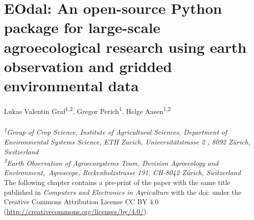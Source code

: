 \chapter{EOdal: An open-source Python package for large-scale agroecological research using earth observation and gridded environmental data}
\label{chap:eodal}
\graphicspath{{./02-EOdal/img}}

Lukas Valentin Graf\textsuperscript{1,2}, Gregor Perich\textsuperscript{1}, Helge Aasen\textsuperscript{1,2}
\\
\normalsize
\vspace{2pt}
\\
\textit{\textsuperscript{1}Group of Crop Science, Institute of Agricultural Sciences, Department of Environmental Systems Science, ETH Zurich, Universitätstrasse 2 , 8092 Zürich, Switzerland
\\
\textsuperscript{2}Earth Observation of Agroecosystems Team, Devision Agroecology and Environment,\ Agroscope, Reckenholzstrasse 191, CH-8042 Zürich, Switzerland
\vspace{2cm}}
\\

The following chapter contains a pre-print of the paper with the same title published in \textsl{Computers and Electronics in Agriculture} with the doi:  under the Creative Commons Attribution License CC BY 4.0 (\url{http://creativecommons.org/licenses/by/4.0/}).


